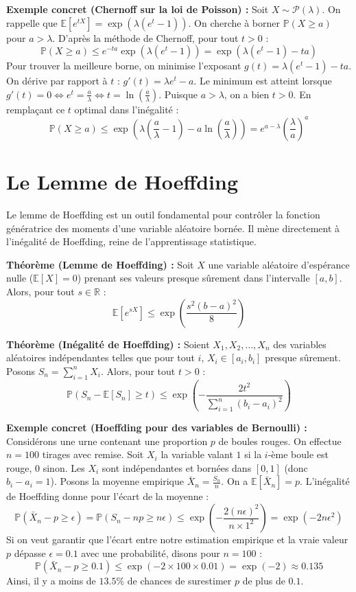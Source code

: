 \documentclass[11pt,a4paper]{article}
\begin{document}
\textbf{Exemple concret (Chernoff sur la loi de Poisson) :}
Soit $X \sim \mathcal{P}(\lambda)$. On rappelle que $\mathbb{E}[e^{tX}] = \exp(\lambda(e^t - 1))$.
On cherche à borner $\mathbb{P}(X \ge a)$ pour $a > \lambda$.
D'après la méthode de Chernoff, pour tout $t > 0$ :
$$ \mathbb{P}(X \ge a) \le e^{-ta} \exp(\lambda(e^t - 1)) = \exp(\lambda(e^t - 1) - ta) $$
Pour trouver la meilleure borne, on minimise l'exposant $g(t) = \lambda(e^t - 1) - ta$.
On dérive par rapport à $t$ : $g'(t) = \lambda e^t - a$.
Le minimum est atteint lorsque $g'(t) = 0 \iff e^t = \frac{a}{\lambda} \iff t = \ln(\frac{a}{\lambda})$.
Puisque $a > \lambda$, on a bien $t > 0$.
En remplaçant ce $t$ optimal dans l'inégalité :
$$ \mathbb{P}(X \ge a) \le \exp\left(\lambda\left(\frac{a}{\lambda} - 1\right) - a\ln\left(\frac{a}{\lambda}\right)\right) = e^{a-\lambda} \left(\frac{\lambda}{a}\right)^a $$

\section{Le Lemme de Hoeffding}

Le lemme de Hoeffding est un outil fondamental pour contrôler la fonction génératrice des moments d'une variable aléatoire bornée. Il mène directement à l'inégalité de Hoeffding, reine de l'apprentissage statistique.

\textbf{Théorème (Lemme de Hoeffding) :}
Soit $X$ une variable aléatoire d'espérance nulle ($\mathbb{E}[X] = 0$) prenant ses valeurs presque sûrement dans l'intervalle $[a, b]$.
Alors, pour tout $s \in \mathbb{R}$ :
$$ \mathbb{E}[e^{sX}] \le \exp\left(\frac{s^2 (b-a)^2}{8}\right) $$

\textbf{Théorème (Inégalité de Hoeffding) :}
Soient $X_1, X_2, \dots, X_n$ des variables aléatoires indépendantes telles que pour tout $i$, $X_i \in [a_i, b_i]$ presque sûrement.
Posons $S_n = \sum_{i=1}^n X_i$. Alors, pour tout $t > 0$ :
$$ \mathbb{P}(S_n - \mathbb{E}[S_n] \ge t) \le \exp\left( - \frac{2t^2}{\sum_{i=1}^n (b_i - a_i)^2} \right) $$

\textbf{Exemple concret (Hoeffding pour des variables de Bernoulli) :}
Considérons une urne contenant une proportion $p$ de boules rouges. On effectue $n = 100$ tirages avec remise. Soit $X_i$ la variable valant $1$ si la $i$-ème boule est rouge, $0$ sinon. Les $X_i$ sont indépendantes et bornées dans $[0, 1]$ (donc $b_i - a_i = 1$).
Posons la moyenne empirique $\bar{X}_n = \frac{S_n}{n}$. On a $\mathbb{E}[\bar{X}_n] = p$.
L'inégalité de Hoeffding donne pour l'écart de la moyenne :
$$ \mathbb{P}(\bar{X}_n - p \ge \epsilon) = \mathbb{P}(S_n - np \ge n\epsilon) \le \exp\left( - \frac{2(n\epsilon)^2}{n \times 1^2} \right) = \exp(-2n\epsilon^2) $$
Si on veut garantir que l'écart entre notre estimation empirique et la vraie valeur $p$ dépasse $\epsilon = 0.1$ avec une probabilité, disons pour $n=100$ :
$$ \mathbb{P}(\bar{X}_n - p \ge 0.1) \le \exp(-2 \times 100 \times 0.01) = \exp(-2) \approx 0.135 $$
Ainsi, il y a moins de $13.5\%$ de chances de surestimer $p$ de plus de $0.1$.
\end{document}
